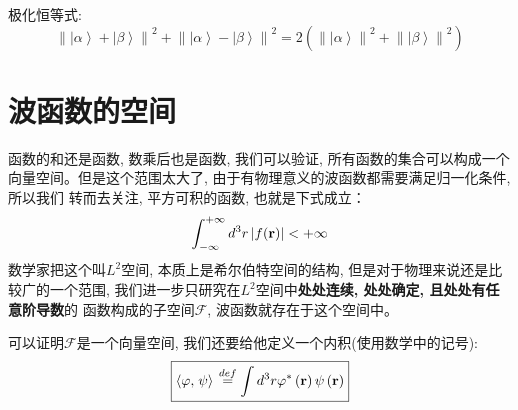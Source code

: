 极化恒等式:
\[{\left\| {\left| \alpha  \right\rangle  + \left| \beta  \right\rangle } \right\|^2} + {\left\| {\left| \alpha  \right\rangle  - \left| \beta  \right\rangle } \right\|^2} = 2\left( {{{\left\| {\left| \alpha  \right\rangle } \right\|}^2} + {{\left\| {\left| \beta  \right\rangle } \right\|}^2}} \right)\]
\section{波函数的空间}
函数的和还是函数, 数乘后也是函数, 我们可以验证, 所有函数的集合可以构成一个向量空间。但是这个范围太大了, 由于有物理意义的波函数都需要满足归一化条件, 所以我们
转而去关注, 平方可积的函数, 也就是下式成立：
\[\int_{ - \infty }^{ + \infty } {{d^3}r\left| {f({\bf{r}})} \right|}  <  + \infty \]
数学家把这个叫$L^2$空间, 本质上是希尔伯特空间的结构, 但是对于物理来说还是比较广的一个范围, 我们进一步只研究在$L^2$空间中\textbf{处处连续, 处处确定, 且处处有任意阶导数}的
函数构成的子空间$\mathscr{F}$, 波函数就存在于这个空间中。

可以证明$\mathscr{F}$是一个向量空间, 我们还要给他定义一个内积(使用数学中的记号):
\begin{equation}
    \boxed{\left\langle {\varphi ,\left. \psi  \right\rangle } \right. \overset{def}{=} \int {{d^3}r} {\varphi ^*}\left( {\bf{r}} \right)\psi \left( {\bf{r}} \right)}
\end{equation}
